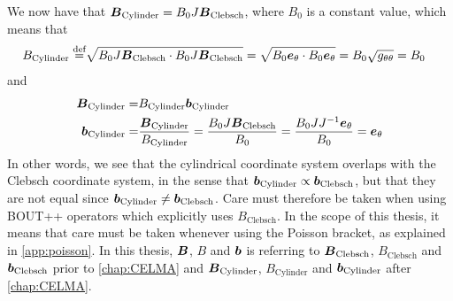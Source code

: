 %
We now have that $\boldsymbol{B}_{\text{Cylinder}}=B_0J\boldsymbol{B}_{\text{Clebsch}}$, where $B_0$ is a constant value, which means that
%
\begin{align*}
    B_{\text{Cylinder}}\overset{\text{def}}{=} &
    \sqrt{B_0J\boldsymbol{B}_{\text{Clebsch}}\cdot B_0J\boldsymbol{B}_{\text{Clebsch}}}
    = \sqrt{B_0\boldsymbol{e}_\theta\cdot B_0\boldsymbol{e}_\theta}
    = B_0\sqrt{g_{\theta\theta}}
    = B_0
\end{align*}
%
and
%
\begin{align*}
    \boldsymbol{B}_{\text{Cylinder}}=&B_{\text{Cylinder}}\boldsymbol{b}_{\text{Cylinder}}\\
    \boldsymbol{b}_{\text{Cylinder}}
    =&\frac{\boldsymbol{B}_{\text{Cylinder}}}{B_{\text{Cylinder}}}
    =\frac{B_0J\boldsymbol{B}_{\text{Clebsch}}}{B_0}
    =\frac{B_0JJ^{-1}\boldsymbol{e}_\theta}{B_0}
    =\boldsymbol{e}_\theta
\end{align*}
%
In other words, we see that the cylindrical coordinate system overlaps with the Clebsch coordinate system, in the sense that $\boldsymbol{b}_{\text{Cylinder}}\propto\boldsymbol{b}_{\text{Clebsch}}$, but that they are not equal since $\boldsymbol{b}_{\text{Cylinder}}\neq\boldsymbol{b}_{\text{Clebsch}}$.
Care must therefore be taken when using BOUT++ operators which explicitly uses ${B}_{\text{Clebsch}}$.
In the scope of this thesis, it means that care must be taken whenever using the Poisson bracket, as explained in \cref{app:poisson}.
In this thesis, $\boldsymbol{B}$, $B$ and $\boldsymbol{b}$ is referring to $\boldsymbol{B}_{\text{Clebsch}}$, $B_{\text{Clebsch}}$ and $\boldsymbol{b}_{\text{Clebsch}}$ prior to \cref{chap:CELMA} and $\boldsymbol{B}_{\text{Cylinder}}$, $B_{\text{Cylinder}}$ and $\boldsymbol{b}_{\text{Cylinder}}$ after \cref{chap:CELMA}.
